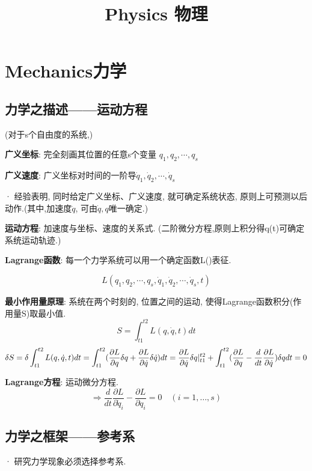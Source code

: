 \documentclass{article}
\title{Physics 物理}\author{}\date{}
\begin{document}
\maketitle
\tableofcontents


\section{Mechanics力学}
    \subsection{力学之描述——运动方程}
        (对于s个自由度的系统,)
        
        \textbf{广义坐标}: 完全刻画其位置的任意s个变量 $q_{1},q_{2},\cdots,q_{s}$
        
        \textbf{广义速度}: 广义坐标对时间的一阶导$\dot q_{1},\dot q_{2},\cdots,\dot q_{s}$
        
        · 经验表明, 同时给定广义坐标、广义速度, 就可确定系统状态, 原则上可预测以后动作.(其中,加速度$\ddot q$, 可由$\dot q,q$唯一确定.)
        
        \textbf{运动方程}: 加速度与坐标、速度的关系式. (二阶微分方程,原则上积分得q(t)可确定系统运动轨迹.)
        
        \textbf{Lagrange函数}: 每一个力学系统可以用一个确定函数L()表征.
        
        $$L(q_{1},q_{2},\cdots,q_{s},\dot q_{1},\dot q_{2},\cdots,\dot q_{s},t)$$
        
        \textbf{最小作用量原理}: 系统在两个时刻的, 位置之间的运动, 使得Lagrange函数积分(作用量S)取最小值.
        $$S = \int_{t1}^{t2} L(q,\dot q,t)dt$$
        $$\delta S = \delta \int_{t1}^{t2} L(q,\dot q,t)dt = \int_{t1}^{t2} (\frac{\partial L}{\partial q}\delta q + \frac{\partial L}{\partial \dot q}\delta \dot q) dt = \frac{\partial L}{\partial \dot q} \delta q \arrowvert_{t1}^{t2} + \int_{t1}^{t2} (\frac{\partial L}{\partial q} - \frac{d}{dt} \frac{\partial L}{\partial \dot q}) \delta q dt = 0$$
        
        \textbf{Lagrange方程}: 运动微分方程. 
        $$\Rightarrow \frac{d}{dt}\frac{\partial L}{\partial \dot q_i} - \frac{\partial L}{\partial q_i} = 0\quad(i=1,\dots,s)$$


    \subsection{力学之框架——参考系}
        · 研究力学现象必须选择参考系.
        
\end{document}
